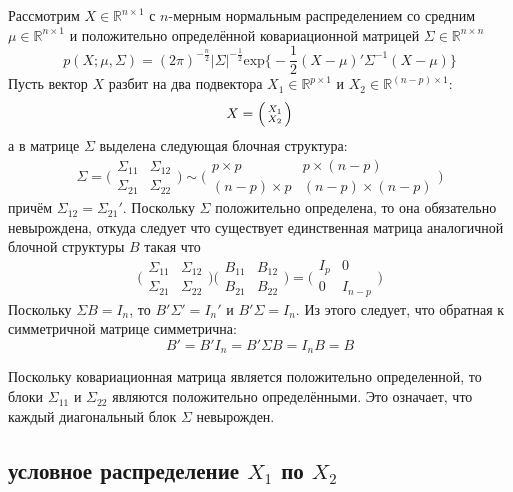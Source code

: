 \documentclass[a4paper]{article}
\newcommand{\Real}{\mathbb{R}}
\begin{document}
Рассмотрим $X\in \Real^{n\times 1}$ с $n$-мерным нормальным распределением со средним
$\mu\in \Real^{n\times 1}$ и положительно определённой ковариационной матрицей
$\Sigma \in \Real^{n\times n}$
\[
p(X;\mu,\Sigma)
= (2\pi)^{-\frac{n}{2}} \lvert \Sigma \rvert^{-\frac{1}{2}}
	\text{exp}\bigl\{-\frac{1}{2}(X-\mu)'\Sigma^{-1}(X-\mu)\bigr\}
\]
Пусть вектор $X$ разбит на два подвектора $X_1\in \Real^{p\times 1}$ и $X_2\in \Real^{(n-p)\times 1}$:
\[X = \Bigl(\begin{smallmatrix} X_1 \\ X_2 \end{smallmatrix}\Bigr)\]
а в матрице $\Sigma$ выделена следующая блочная структура:
\[
\Sigma
= \biggl(\begin{matrix}\Sigma_{11} & \Sigma_{12}\\\Sigma_{21} & \Sigma_{22}\end{matrix}\biggr)
\sim \biggl(\begin{matrix}p\times p & p\times (n-p)\\(n-p)\times p & (n-p)\times (n-p)\end{matrix}\biggr)
\]
причём $\Sigma_{12} = \Sigma_{21}'$. Поскольку $\Sigma$ положительно определена,
то она обязательно невырождена, откуда следует что существует единственная матрица
аналогичной блочной структуры $B$ такая что
\[
\biggl(\begin{matrix}\Sigma_{11} & \Sigma_{12}\\\Sigma_{21} & \Sigma_{22}\end{matrix}\biggr)
\biggl(\begin{matrix}B_{11} & B_{12}\\B_{21} & B_{22}\end{matrix}\biggr)
=
\biggl(\begin{matrix}I_p & 0\\0 & I_{n-p}\end{matrix}\biggr)
\]
Поскольку $\Sigma B = I_n$, то $B'\Sigma' = I_n'$ и $B'\Sigma = I_n$. Из этого следует,
что обратная к симметричной матрице симметрична:
\[B' = B' I_n = B' \Sigma B = I_n B = B\]

Поскольку ковариационная матрица является положительно определенной, то блоки
$\Sigma_{11}$ и $\Sigma_{22}$ являются положительно определёнными. Это означает,
что каждый диагональный блок $\Sigma$ невырожден.

\subsection*{условное распределение $X_1$ по $X_2$} %
\label{sub:conditional_x_1_x_2}
\end{document}

